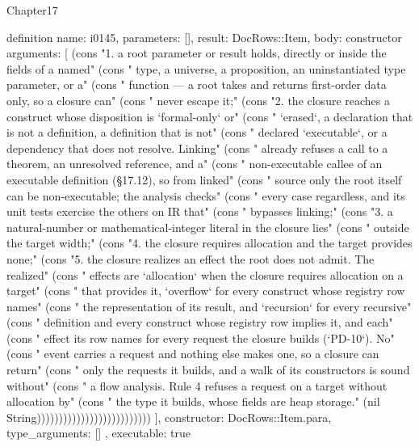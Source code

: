 \begin{lexlean}{Chapter17}
\begin{semanticmodule}
definition{
  name: i0145,
  parameters: [],
  result: DocRows::Item,
  body: constructor{
    arguments: [
      (cons "1. a root parameter or result holds, directly or inside the fields of a named" (cons "   type, a universe, a proposition, an uninstantiated type parameter, or a" (cons "   function — a root takes and returns first-order data only, so a closure can" (cons "   never escape it;" (cons "2. the closure reaches a construct whose disposition is `formal-only` or" (cons "   `erased`, a declaration that is not a definition, a definition that is not" (cons "   declared `executable`, or a dependency that does not resolve. Linking" (cons "   already refuses a call to a theorem, an unresolved reference, and a" (cons "   non-executable callee of an executable definition (§17.12), so from linked" (cons "   source only the root itself can be non-executable; the analysis checks" (cons "   every case regardless, and its unit tests exercise the others on IR that" (cons "   bypasses linking;" (cons "3. a natural-number or mathematical-integer literal in the closure lies" (cons "   outside the target width;" (cons "4. the closure requires allocation and the target provides none;" (cons "5. the closure realizes an effect the root does not admit. The realized" (cons "   effects are `allocation` when the closure requires allocation on a target" (cons "   that provides it, `overflow` for every construct whose registry row names" (cons "   the representation of its result, and `recursion` for every recursive" (cons "   definition and every construct whose registry row implies it, and each" (cons "   effect its row names for every request the closure builds (`PD-10`). No" (cons "   event carries a request and nothing else makes one, so a closure can return" (cons "   only the requests it builds, and a walk of its constructors is sound without" (cons "   a flow analysis. Rule 4 refuses a request on a target without allocation by" (cons "   the type it builds, whose fields are heap storage." (nil String))))))))))))))))))))))))))
    ],
    constructor: DocRows::Item.para,
    type_arguments: []
  },
  executable: true
}


\end{semanticmodule}
\end{lexlean}

